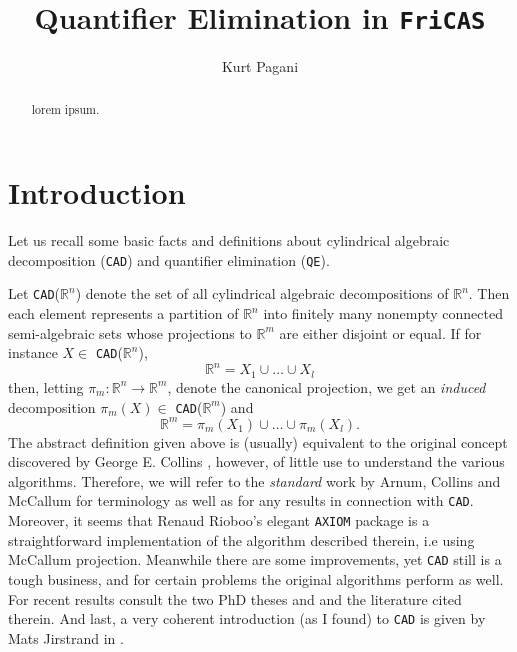 \documentclass[12pt,a4paper]{article}
\author{Kurt Pagani}
\title{Quantifier Elimination in {\tt FriCAS}}
\newcommand{\CAD}{{\tt CAD}}
\newcommand{\QE}{{\tt QE}}
\newcommand{\RR}[1]{\mathbb{R}^{#1}}
\begin{document}
\maketitle

\begin{abstract}
lorem ipsum. 
\end{abstract}

\section{Introduction}
Let us recall some basic facts and definitions about cylindrical algebraic decomposition (\CAD) and quantifier elimination (\QE).

Let \CAD($\RR n$) denote the set of all cylindrical algebraic 
decompositions of $\RR n$. Then each element represents a partition of
$\RR n$ into finitely many nonempty connected semi-algebraic sets whose 
projections to $\RR m$ are either disjoint or equal. If for instance
$X\in$ \CAD($\RR n$),
\begin{equation}
       \RR n = X_1 \cup \ldots \cup X_l        
\end{equation}
then, letting $\pi_m:\RR n \rightarrow \RR m$, denote the canonical projection, we get an {\sl induced} decomposition $\pi_m(X)\in$ \CAD($\RR m$) and
\begin{equation}
       \RR m = \pi_m(X_1) \cup \ldots \cup \pi_m(X_l).        
\end{equation} 
The abstract definition given above is (usually) equivalent to the original 
concept discovered by George E. Collins \cite{COL73}, however, of little use
to understand the various algorithms. Therefore, we will refer to the 
{\sl standard} work \cite{ACM82} by Arnum, Collins and McCallum for terminology as well as for any results in connection with {\tt CAD}. Moreover, it seems that
Renaud Rioboo's elegant {\tt AXIOM} package is a straightforward implementation
of the algorithm described therein, i.e using McCallum projection. Meanwhile there are some improvements, yet {\tt CAD} still is a tough business, and for certain
problems the original algorithms perform as well. For recent results consult
the two PhD theses \cite{GP11} and \cite{WDJ14} and the literature cited therein.     
And last, a very coherent introduction (as I found) to {\CAD} is given by
Mats Jirstrand in \cite{JM95}.
\end{document}
